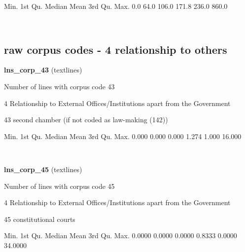 \documentclass[]{article}
\newenvironment{Shaded}{\begin{snugshade}}{\end{snugshade}}
\newcommand{\FloatTok}[1]{\textcolor[rgb]{0.00,0.00,0.81}{{#1}}}
\newcommand{\NormalTok}[1]{{#1}}
\begin{document}
\begin{Shaded}
\begin{Highlighting}[]
   \NormalTok{Min. 1st Qu.  Median    Mean 3rd Qu.    Max. }
    \FloatTok{0.0}    \FloatTok{64.0}   \FloatTok{106.0}   \FloatTok{171.8}   \FloatTok{236.0}   \FloatTok{860.0} 
\end{Highlighting}
\end{Shaded}

~

\vspace{1em}

\subsection{raw corpus codes - 4 relationship to
others}\label{raw-corpus-codes---4-relationship-to-others}

\textbf{lns\_corp\_43} (textlines)

Number of lines with corpus code 43

4 Relationship to External Offices/Institutions apart from the
Government

43 second chamber (if not coded as law-making (142))

\begin{Shaded}
\begin{Highlighting}[]
   \NormalTok{Min. 1st Qu.  Median    Mean 3rd Qu.    Max. }
  \FloatTok{0.000}   \FloatTok{0.000}   \FloatTok{0.000}   \FloatTok{1.274}   \FloatTok{1.000}  \FloatTok{16.000} 
\end{Highlighting}
\end{Shaded}

~

\vspace{1em}

\textbf{lns\_corp\_45} (textlines)

Number of lines with corpus code 45

4 Relationship to External Offices/Institutions apart from the
Government

45 constitutional courts

\begin{Shaded}
\begin{Highlighting}[]
   \NormalTok{Min. 1st Qu.  Median    Mean 3rd Qu.    Max. }
 \FloatTok{0.0000}  \FloatTok{0.0000}  \FloatTok{0.0000}  \FloatTok{0.8333}  \FloatTok{0.0000} \FloatTok{34.0000} 
\end{Highlighting}
\end{Shaded}
\end{document}
